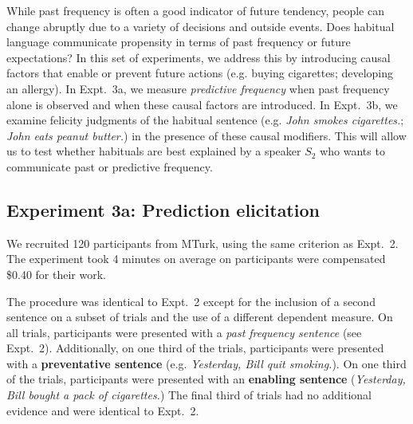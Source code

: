 \documentclass[10pt,letterpaper]{article}
\newcommand{\ndg}[1]{\textcolor{Green}{[ndg: #1]}}
\begin{document}
While past frequency is often a good indicator of future tendency, people can change abruptly due to a variety of decisions and outside events.
Does habitual language communicate propensity in terms of past frequency or future expectations?
In this set of experiments, we address this by introducing causal factors that enable or prevent future actions (e.g. buying cigarettes; developing an allergy).
In Expt.~3a, we measure \emph{predictive frequency} when past frequency alone is observed and when these causal factors are introduced.
In Expt.~3b, we examine felicity judgments of the habitual sentence (e.g. \emph{John smokes cigarettes.}; \emph{John eats peanut butter.}) in the presence of these causal modifiers.
This will allow us to test whether habituals are best explained by a speaker $S_2$ who wants to communicate past or predictive frequency.

\subsection{Experiment 3a: Prediction elicitation}


We recruited 120 participants from MTurk, using the same criterion as Expt.~2.
The experiment took 4 minutes on average on participants were compensated \$0.40 for their work.

The procedure was identical to Expt.~2 except for the inclusion of a second sentence on a subset of trials and the use of a different dependent measure. 
On all trials, participants were presented with a \emph{past frequency sentence} (see Expt.~2).
Additionally, on one third of the trials, participants were presented with a \textbf{preventative sentence} (e.g. \emph{Yesterday, Bill quit smoking.}). %
On one third of the trials, participants were presented with an \textbf{enabling sentence} (\emph{Yesterday, Bill bought a pack of cigarettes.}) %
The final third of trials had no additional evidence and were identical to Expt.~2. 
\end{document}
